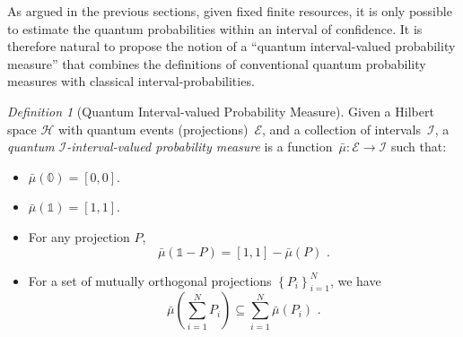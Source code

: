 \documentclass[12pt]{iopart}
\theoremstyle{remark}
\newtheorem{definition}{Definition}
\newcommand{\Hilb}{\mathcal{H}}
\newcommand{\events}{\ensuremath{\mathcal{E}}}
\begin{document}
As argued in the previous sections, given fixed finite resources,
it is only possible to estimate the quantum probabilities within an
interval of confidence. It is therefore natural to propose the notion
of a ``quantum interval-valued probability measure'' that combines
the definitions of conventional quantum probability measures with
classical interval-probabilities.

\begin{definition}[Quantum Interval-valued Probability Measure]\label{def:QuantumInterval-valuedProbability}
Given a Hilbert space $\Hilb$ with quantum events (projections)~$\events$,
and a collection of intervals~$\mathscr{I}$, a \emph{quantum $\mathscr{I}$-interval-valued
probability measure} is a function~$\bar{\mu}:\events\rightarrow\mathscr{I}$
such that: 
\begin{itemize}
\item $\bar{\mu}(\mathbb{0})=\left[0,0\right]$. 
\item $\bar{\mu}(\mathbb{1})=\left[1,1\right]$. 
\item For any projection $P$, 
\begin{equation}
\bar{\mu}\left(\mathbb{1}-P\right)=\left[1,1\right]-\bar{\mu}\left(P\right)\textrm{ .}\label{eq:QuantumInterval-valuedProbability-Complement}
\end{equation}
\item For a set of mutually orthogonal projections $\left\{ P_{i}\right\} _{i=1}^{N}$,
we have 
\begin{equation}
\bar{\mu}\left(\sum_{i=1}^{N}P_{i}\right)\subseteq\sum_{i=1}^{N}\bar{\mu}\left(P_{i}\right)\textrm{ .}\label{eq:QuantumInterval-valuedProbability-Inclusion}
\end{equation}
\end{itemize}
\end{definition}
\end{document}
